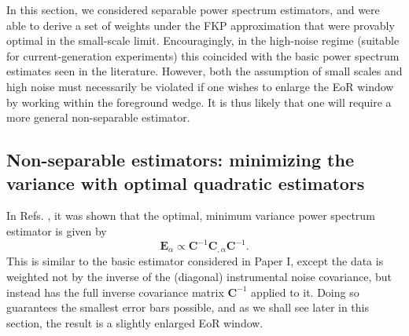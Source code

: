 \documentclass[twocolumn,aps,prd,nofootinbib,showpacs]{revtex4-1}
\begin{document}
In this section, we considered separable power spectrum estimators, and were able to derive a set of weights under the FKP approximation that were provably optimal in the small-scale limit.  Encouragingly, in the high-noise regime (suitable for current-generation experiments) this coincided with the basic power spectrum estimates seen in the literature.  However, both the assumption of small scales and high noise must necessarily be violated if one wishes to enlarge the EoR window by working within the foreground wedge.  It is thus likely that one will require a more general non-separable estimator.

%
%

\subsection{Non-separable estimators: minimizing the variance with optimal quadratic estimators}
\label{sec:BetterEst}

In Refs. \cite{Tegmark1997b,Bond1998}, it was shown that the optimal, minimum variance power spectrum estimator is given by
\begin{equation}
\label{eq:OptEalpha}
\mathbf{E}_\alpha \propto \mathbf{C}^{-1} \mathbf{C}_{,\alpha} \mathbf{C}^{-1}.
\end{equation}
This is similar to the basic estimator considered in Paper I, except the data is weighted not by the inverse of the (diagonal) instrumental noise covariance, but instead has the full inverse covariance matrix $\mathbf{C}^{-1}$ applied to it.  Doing so guarantees the smallest error bars possible, and as we shall see later in this section, the result is a slightly enlarged EoR window.
\end{document}
